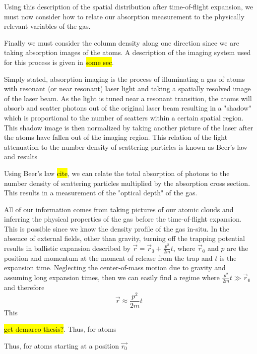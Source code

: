 Using this description of the spatial distribution after time-of-flight expansion, we must now consider how to relate our absorption measurement to the physically relevant variables of the gas.

Finally we must consider the column density along one direction since we are taking absorption images of the atoms. A description of the imaging system used for this process is given in \hl{some sec}. 

Simply stated, absorption imaging is the process of illuminating a gas of atoms with resonant (or near resonant) laser light and taking a spatially resolved image of the laser beam. As the light is tuned near a resonant transition, the atoms will absorb and scatter photons out of the original laser beam resulting in a "shadow" which is proportional to the number of scatters within a certain spatial region. This shadow image is then normalized by taking another picture of the laser after the atoms have fallen out of the imaging region. This relation of the light attenuation to the number density of scattering particles is known as Beer's law and results 

Using Beer's law \hl{cite}, we can relate the total absorption of photons to the number density of scattering particles multiplied by the absorption cross section. This results in a measurement of the "optical depth" of the gas. 




All of our information comes from taking pictures of our atomic clouds and inferring the physical properties of the gas before the time-of-flight expansion. This is possible since we know the density profile of the gas in-situ. In the absence of external fields, other than gravity, turning off the trapping potential results in ballistic expansion described by $\vec{r} = \vec{r}_0 + \frac{p^2}{2m}t$, where $\vec{r}_0$ and $p$ are the position and momentum at the moment of release from the trap and $t$ is the expansion time. Neglecting the center-of-mass motion due to gravity and assuming long expansion times, then we can easily find a regime where $\frac{p^2}{2m}t \gg \vec{r}_0$ and therefore
	\begin{equation}
		\vec{r} \approx \frac{p^2}{2m}t
	\end{equation}
This 





 \cite{Ketterle1999} \hl{get demarco thesis?}. Thus, for atoms 

Thus, for atoms starting at a position $\vec{r_0}$ 

